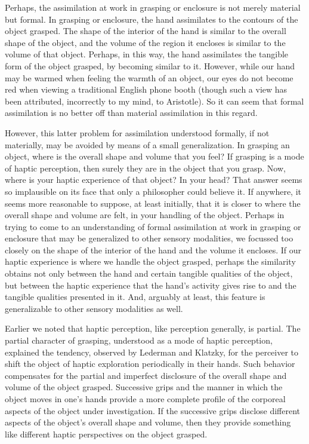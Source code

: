 \documentclass[12pt]{article}
\begin{document}
Perhaps, the assimilation at work in grasping or enclosure is not merely material but formal. In grasping or enclosure, the hand assimilates to the contours of the object grasped. The shape of the interior of the hand is similar to the overall shape of the object, and the volume of the region it encloses is similar to the volume of that object. Perhaps, in this way, the hand assimilates the tangible form of the object grasped, by becoming similar to it. However, while our hand may be warmed when feeling the warmth of an object, our eyes do not become red when viewing a traditional English phone booth (though such a view has been attributed, incorrectly to my mind, to Aristotle). So it can seem that formal assimilation is no better off than material assimilation in this regard.

However, this latter problem for assimilation understood formally, if not materially, may be avoided by means of a small generalization. In grasping an object, where is the overall shape and volume that you feel? If grasping is a mode of haptic perception, then surely they are in the object that you grasp. Now, where is your haptic experience of that object? In your head? That answer seems so implausible on its face that only a philosopher could believe it. If anywhere, it seems more reasonable to suppose, at least initially, that it is closer to where the overall shape and volume are felt, in your handling of the object. Perhaps in trying to come to an understanding of formal assimilation at work in grasping or enclosure that may be generalized to other sensory modalities, we focussed too closely on the shape of the interior of the hand and the volume it encloses. If our haptic experience is where we handle the object grasped, perhaps the similarity obtains not only between the hand and certain tangible qualities of the object, but between the haptic experience that the hand's activity gives rise to and the tangible qualities presented in it. And, arguably at least, this feature is generalizable to other sensory modalities as well.

Earlier we noted that haptic perception, like perception generally, is partial. The partial character of grasping, understood as a mode of haptic perception, explained the tendency, observed by Lederman and Klatzky, for the perceiver to shift the object of haptic exploration periodically in their hands. Such behavior compensates for the partial and imperfect disclosure of the overall shape and volume of the object grasped. Successive grips and the manner in which the object moves in one's hands provide a more complete profile of the corporeal aspects of the object under investigation. If the successive grips disclose different aspects of the object's overall shape and volume, then they provide something like different haptic perspectives on the object grasped. 
\end{document}
